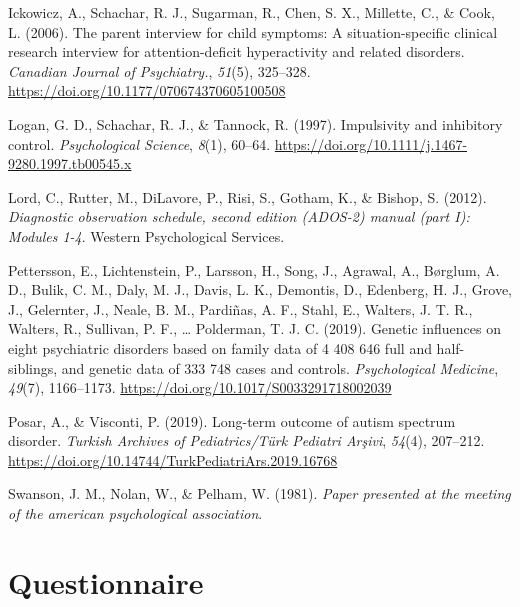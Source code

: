 \documentclass[
  letterpaper,
]{ut-thesis}
\newlength{\cslhangindent}
\newenvironment{CSLReferences}[2] %
 {\begin{list}{}{%
  \setlength{\itemindent}{0pt}
  \setlength{\leftmargin}{0pt}
  \setlength{\parsep}{0pt}
  \ifodd #1
   \setlength{\leftmargin}{\cslhangindent}
   \setlength{\itemindent}{-1\cslhangindent}
  \fi
  \setlength{\itemsep}{#2\baselineskip}}}
 {\end{list}}
\begin{document}
\begin{CSLReferences}{1}{0}
Ickowicz, A., Schachar, R. J., Sugarman, R., Chen, S. X., Millette, C.,
\& Cook, L. (2006). The parent interview for child symptoms: A
situation-specific clinical research interview for attention-deficit
hyperactivity and related disorders. \emph{Canadian Journal of
Psychiatry.}, \emph{51}(5), 325--328.
\url{https://doi.org/10.1177/070674370605100508}

Logan, G. D., Schachar, R. J., \& Tannock, R. (1997). Impulsivity and
inhibitory control. \emph{Psychological Science}, \emph{8}(1), 60--64.
\url{https://doi.org/10.1111/j.1467-9280.1997.tb00545.x}

Lord, C., Rutter, M., DiLavore, P., Risi, S., Gotham, K., \& Bishop, S.
(2012). \emph{Diagnostic observation schedule, second edition ({ADOS-2})
manual (part {I}): {Modules} 1-4}. Western Psychological Services.

Pettersson, E., Lichtenstein, P., Larsson, H., Song, J., Agrawal, A.,
Børglum, A. D., Bulik, C. M., Daly, M. J., Davis, L. K., Demontis, D.,
Edenberg, H. J., Grove, J., Gelernter, J., Neale, B. M., Pardiñas, A.
F., Stahl, E., Walters, J. T. R., Walters, R., Sullivan, P. F., \ldots{}
Polderman, T. J. C. (2019). Genetic influences on eight psychiatric
disorders based on family data of 4 408 646 full and half-siblings, and
genetic data of 333 748 cases and controls. \emph{Psychological
Medicine}, \emph{49}(7), 1166--1173.
\url{https://doi.org/10.1017/S0033291718002039}

Posar, A., \& Visconti, P. (2019). Long-term outcome of autism spectrum
disorder. \emph{Turkish Archives of Pediatrics/Türk Pediatri Arşivi},
\emph{54}(4), 207--212.
\url{https://doi.org/10.14744/TurkPediatriArs.2019.16768}

Swanson, J. M., Nolan, W., \& Pelham, W. (1981). \emph{Paper presented
at the meeting of the american psychological association}.

\end{CSLReferences}

\cleardoublepage
{}
{}
\appendix

\chapter{Questionnaire}\label{sec-apx1}



\end{document}

